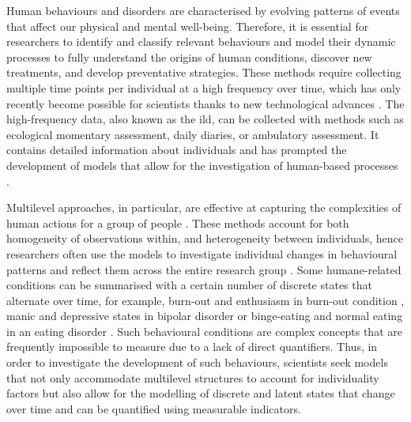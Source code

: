 Human behaviours and disorders are characterised by evolving patterns of events that affect our physical and mental well-being. Therefore, it is essential for researchers to identify and classify relevant behaviours and model their dynamic processes to fully understand the origins of human conditions, discover new treatments, and develop preventative strategies. These methods require collecting multiple time points per individual at a high frequency over time, which has only recently become possible for scientists thanks to new technological advances \citep{shiffman_ecological_2008,ARIENS2020110191}. The high-frequency data, also known as the \ac{ild}, can be collected with methods such as ecological momentary assessment, daily diaries, or ambulatory assessment. It contains detailed information about individuals and has prompted the development of models that allow for the investigation of human-based processes \citep{bolger2013intensive}.

Multilevel approaches, in particular, are effective at capturing the complexities of human actions for a group of people \citep[][]{Walls_Schafer_2006}. These methods account for both homogeneity of observations within, and heterogeneity between individuals, hence researchers often use the models to investigate individual changes in behavioural patterns and reflect them across the entire research group \citep{hamaker_no_2017}. Some humane-related conditions can be summarised with a certain number of discrete states that alternate over time, for example, burn-out and enthusiasm in burn-out condition \citep{Maslach_Leiter_2016}, manic and depressive states in bipolar disorder \citep{Kukopulos_Reginaldi_Laddomada_Floris_Serra_Tondo_2008} or binge-eating and normal eating in an eating disorder \citep{Bulik_Butner_Tregarthen_Thornton_Flatt_Smith_Carroll_Baucom_Deboeck_2020}. Such behavioural conditions are complex concepts that are frequently impossible to measure due to a lack of direct quantifiers. Thus, in order to investigate the development of such behaviours, scientists seek models that not only accommodate multilevel structures to account for individuality factors but also allow for the modelling of discrete and latent states that change over time and can be quantified using measurable indicators.

